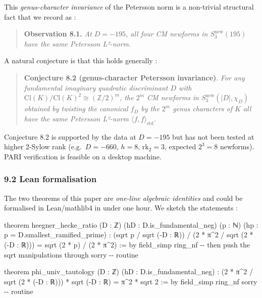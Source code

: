 \documentclass[
  11pt,
  a4paper,
]{amsart}
\newenvironment{Shaded}{}{}
\newcommand{\NormalTok}[1]{#1}
\begin{document}
This \emph{genus-character invariance} of the Petersson norm is a non-trivial structural fact that we record as :

\begin{quote}
\textbf{Observation 8.1.} \emph{At \(D = -195\), all four CM newforms in \(S_3^{\mathrm{new}}(195)\) have the same Petersson L²-norm.}
\end{quote}

A natural conjecture is that this holds generally :

\begin{quote}
\textbf{Conjecture 8.2 (genus-character Petersson invariance)}. \emph{For any fundamental imaginary quadratic discriminant \(D\) with \(\mathrm{Cl}(K)/\mathrm{Cl}(K)^{2} \cong (\mathbb{Z}/2)^{m}\), the \(2^{m}\) CM newforms in \(S_3^{\mathrm{new}}(|D|, \chi_D)\) obtained by twisting the canonical \(f_D\) by the \(2^{m}\) genus characters of \(K\) all have the same Petersson L²-norm \(\langle f, f\rangle_{\mathrm{std}}\).}
\end{quote}

Conjecture 8.2 is supported by the data at \(D = -195\) but has not been tested at higher 2-Sylow rank (e.g.~\(D = -660\), \(h = 8\), \(\mathrm{rk}_2 = 3\), expected \(2^{3}=8\) newforms). PARI verification is feasible on a desktop machine.

\hypertarget{lean-formalisation}{%
\subsubsection{9.2 Lean formalisation}\label{lean-formalisation}}

The two theorems of this paper are \emph{one-line algebraic identities} and could be formalised in Lean/mathlib4 in under one hour. We sketch the statements :

\begin{Shaded}
\begin{Highlighting}[]
\NormalTok{theorem heegner\_hecke\_ratio (D : ℤ) (hD : D.is\_fundamental\_neg)}
\NormalTok{    (p : ℕ) (hp : p = D.smallest\_ramified\_prime) :}
\NormalTok{    (sqrt p / sqrt ({-}D : ℝ)) / (2 * π\^{}2 / sqrt (2 * ({-}D : ℝ)))}
\NormalTok{    = sqrt (2 * p) / (2 * π\^{}2) := by}
\NormalTok{  field\_simp}
\NormalTok{  ring\_nf}
\NormalTok{  {-}{-} then push the sqrt manipulations through}
\NormalTok{  sorry  {-}{-} routine}

\NormalTok{theorem phi\_univ\_tautology (D : ℤ) (hD : D.is\_fundamental\_neg) :}
\NormalTok{    (2 * π\^{}2 / sqrt (2 * ({-}D : ℝ))) * sqrt ({-}D : ℝ) = π\^{}2 * sqrt 2 := by}
\NormalTok{  field\_simp}
\NormalTok{  ring\_nf}
\NormalTok{  sorry  {-}{-} routine}
\end{Highlighting}
\end{Shaded}
\end{document}
